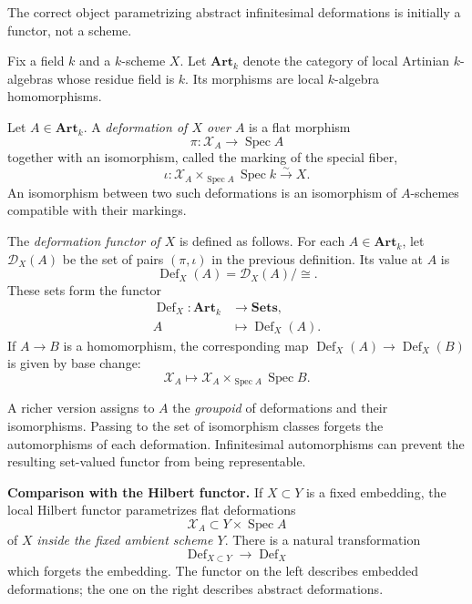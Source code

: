\noindent
The correct object parametrizing abstract
infinitesimal deformations is initially a
functor, not a scheme.

Fix a field $k$ and a $k$-scheme $X$. Let
$\mathbf{Art}_k$ denote the category of
local Artinian $k$-algebras whose residue
field is $k$. Its morphisms are local
$k$-algebra homomorphisms.

\begin{definition}
\label{definition-deformation-artin}
Let $A\in\mathbf{Art}_k$. A
\emph{deformation of $X$ over $A$} is a
flat morphism
$$
\pi:\mathcal{X}_A\longrightarrow
\operatorname{Spec}A
$$
together with an isomorphism, called the
marking of the special fiber,
$$
\iota:\mathcal{X}_A
\times_{\operatorname{Spec}A}
\operatorname{Spec}k\xrightarrow{\sim}X.
$$
An isomorphism between two such deformations
is an isomorphism of $A$-schemes compatible
with their markings.
\end{definition}

\begin{definition}
\label{definition-def-x}
The \emph{deformation functor of $X$} is
defined as follows. For each
$A\in\mathbf{Art}_k$, let $\mathcal{D}_X(A)$
be the set of pairs $(\pi,\iota)$ in the
previous definition. Its value at $A$ is
$$
\operatorname{Def}_X(A)
=
\mathcal{D}_X(A)/{\cong}.
$$
These sets form the functor
$$
\begin{aligned}
\operatorname{Def}_X:
\mathbf{Art}_k&\longrightarrow
\mathbf{Sets},\\
A&\longmapsto
\operatorname{Def}_X(A).
\end{aligned}
$$
If $A\to B$ is a homomorphism, the
corresponding map
$\operatorname{Def}_X(A)\to
\operatorname{Def}_X(B)$ is given by base
change:
$$
\mathcal{X}_A\longmapsto
\mathcal{X}_A\times_{\operatorname{Spec}A}
\operatorname{Spec}B.
$$
\end{definition}

\noindent
A richer version assigns to $A$ the
\emph{groupoid} of deformations and their
isomorphisms. Passing to the set of
isomorphism classes forgets the automorphisms
of each deformation. Infinitesimal
automorphisms can prevent the resulting
set-valued functor from being representable.

\medskip\noindent
\textbf{Comparison with the Hilbert
functor.}
If $X\subset Y$ is a fixed embedding, the
local Hilbert functor parametrizes flat
deformations
$$
\mathcal{X}_A\subset Y\times
\operatorname{Spec}A
$$
of $X$ \emph{inside the fixed ambient
scheme $Y$}. There is a natural
transformation
$$
\operatorname{Def}_{X\subset Y}
\longrightarrow
\operatorname{Def}_X
$$
which forgets the embedding. The functor on
the left describes embedded deformations;
the one on the right describes abstract
deformations.

